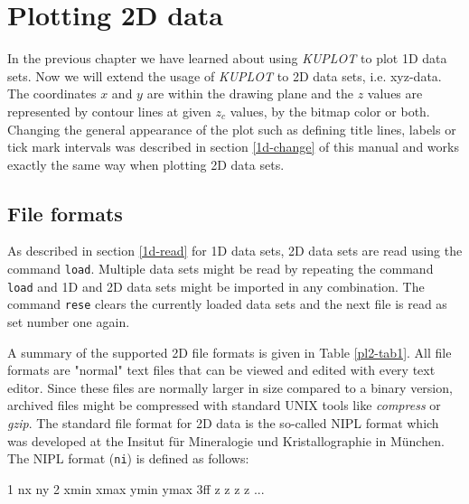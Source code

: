 
\chapter{Plotting 2D data \label {2d}}

In the previous chapter we have learned about using {\it KUPLOT}
to plot 1D data sets. Now we will extend the usage of {\it KUPLOT}
to 2D data sets, i.e. xyz-data. The coordinates $x$ and $y$ are
within the drawing plane and the $z$ values are represented by
contour lines at given $z_{c}$ values, by the bitmap color or
both. Changing the general appearance of the plot such as defining
title lines, labels or tick mark intervals was described in
section \ref{1d-change} of this manual and works exactly the same
way when plotting 2D data sets.


\section{File formats \label{2d-read}}

As described in section \ref{1d-read} for 1D data sets, 2D data sets
are read using the command {\tt load}. Multiple data sets might be
read by repeating the command {\tt load} and 1D and 2D data sets
might be imported in any combination. The command {\tt rese} clears
the currently loaded data sets and the next file is read as set
number one again.
\par

A summary of the supported 2D file formats is given in Table
\ref{pl2-tab1}. All file formats are "normal" text files that can be
viewed and edited with every text editor. Since these files are
normally larger in size compared to a binary version, archived files
might be compressed with standard UNIX tools like {\it compress} or
{\it gzip}. The standard file format for 2D data is the so-called
NIPL format which was developed at the Insitut f\"ur Mineralogie und
Kristallographie in M\"unchen. The NIPL format ({\tt ni}) is defined
as follows:

\footnotesize
\begin{MacVerbatim}
    1      nx ny
    2      xmin xmax ymin ymax
    3ff    z z z z ...
\end{MacVerbatim}
\normalsize

